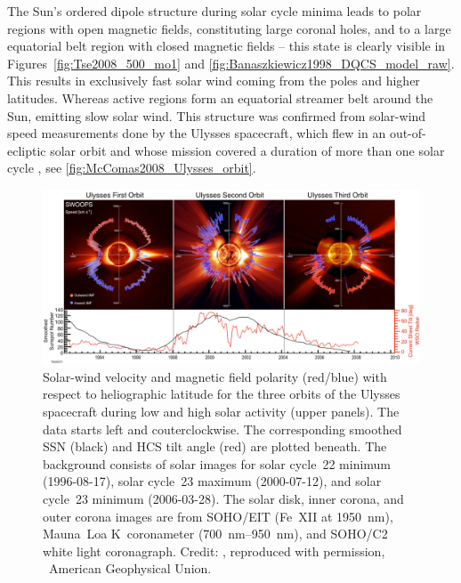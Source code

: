 The Sun's ordered dipole structure during solar cycle minima leads to polar regions with open magnetic fields, constituting large coronal holes, and to a large equatorial belt region with closed magnetic fields -- this state is clearly visible in Figures~\ref{fig:Tse2008_500_mo1} and \ref{fig:Banaszkiewicz1998_DQCS_model_raw}. This results in exclusively fast solar wind coming from the poles and higher latitudes. Whereas active regions form an equatorial streamer belt around the Sun, emitting slow solar wind. This structure was confirmed from solar-wind speed measurements done by the Ulysses spacecraft, which flew in an out-of-ecliptic solar orbit and whose mission covered a duration of more than one solar cycle \citep{McComas200809}, see \autoref{fig:McComas2008_Ulysses_orbit}.
\begin{figure}[htb]
	\centering
	\includegraphics[width=\textwidth]{images/McComas2008_Ulysses_orbit_.png}
	\caption{Solar-wind velocity and magnetic field polarity (red/blue) with respect to heliographic latitude for the three orbits of the Ulysses spacecraft during low and high solar activity (upper panels). The data starts left and couterclockwise. The corresponding smoothed SSN (black) and HCS tilt angle (red) are plotted beneath. The background consists of solar images for solar cycle~22 minimum (1996-08-17), solar cycle~23 maximum (2000-07-12), and solar cycle~23 minimum (2006-03-28). The solar disk, inner corona, and outer corona images are from SOHO/EIT (Fe~XII at \SI{1950}{\nano\meter}), Mauna~Loa K~coronameter (\SIrange{700}{950}{\nano\meter}), and SOHO/C2 white light coronagraph. Credit: \citet[][Fig.~1]{McComas200809}, reproduced with permission, \textcopyright~American Geophysical Union.}
	\label{fig:McComas2008_Ulysses_orbit}
\end{figure}
